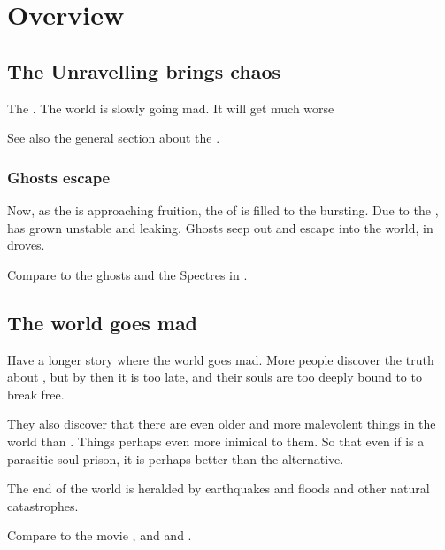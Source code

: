 \section{Overview}









\subsection{The Unravelling brings chaos}
The . 
The world is slowly going mad. 
It will get much worse\prikker

See also the general section about the . 





\subsubsection{Ghosts escape}
Now, as the  is approaching fruition, the \carcer{} of \Iquin{} is filled to the bursting. 
Due to the , \Iquin{} has grown unstable and leaking. 
Ghosts seep out and escape into the world, in droves. 

Compare to the ghosts and the Spectres in \cite{PhillipPullman:HisDarkMaterials}. 









\subsection{The world goes mad}
Have a longer story where the world goes mad. 
More people discover the truth about \iquin, but by then it is too late, and their souls are too deeply bound to \iquin to break free. 

They also discover that there are even older and more malevolent things in the world than \iquin.
Things perhaps even more inimical to them.
So that even if \iquin is a parasitic soul prison, it is perhaps better than the alternative. 

The end of the world is heralded by earthquakes and floods and other natural catastrophes. 

Compare to the movie \cite{Movie:IntheMouthofMadness}, and \cite{RobertBloch:StrangeEons} and \cite{RPG:CallofCthulhu:EndTime}. 

